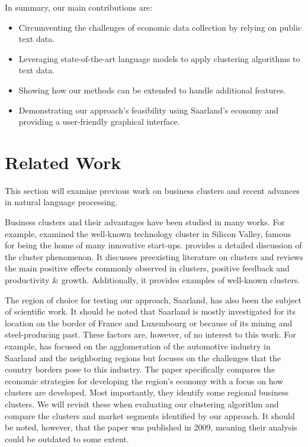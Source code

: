 \documentclass[12pt]{article}
\begin{document}
   In summary, our main contributions are:
   \begin{itemize}[noitemsep]
   	\item Circumventing the challenges of economic data collection by relying on public text data.
   	\item Leveraging state-of-the-art language models to apply clustering algorithms to text data.
   	\item Showing how our methods can be extended to handle additional features.
   	\item Demonstrating our approach's feasibility using Saarland's economy and providing a user-friendly graphical interface.
   \end{itemize}
   
   \section{Related Work}
   This section will examine previous work on business clusters and recent advances in natural language processing.
   
   Business clusters and their advantages have been studied in many works. For example, \cite{regionaladv} examined the well-known technology cluster in Silicon Valley, famous for being the home of many innovative start-ups. 
   \cite{clustertheory} provides a detailed discussion of the cluster phenomenon. It discusses preexisting literature on clusters and reviews the main positive effects commonly observed in clusters, positive feedback and productivity \& growth. Additionally, it provides examples of well-known clusters.
   
   The region of choice for testing our approach, Saarland, has also been the subject of scientific work. It should be noted that Saarland is mostly investigated for its location on the border of France and Luxembourg or because of its mining and steel-producing past.
   These factors are, however, of no interest to this work. For example, \cite{saarlandeco1} has focused on the agglomeration of the automotive industry in Saarland and the neighboring regions but focuses on the challenges that the country borders pose to this industry.
   The paper \cite{saarlandeco2} specifically compares the economic strategies for developing the region's economy with a focus on how clusters are developed. Most importantly, they identify some regional business clusters. We will revisit these when evaluating our clustering algorithm and compare the clusters and market segments identified by our approach. It should be noted, however, that the paper was published in 2009, meaning their analysis could be outdated to some extent.
   
\end{document}
